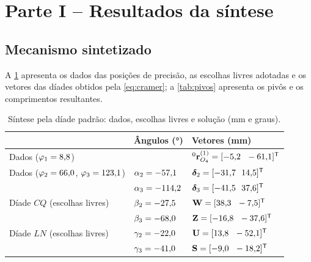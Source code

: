 \documentclass[12pt,a4paper,twoside]{article}
\newcommand{\rv}[2]{{}^{#1}\mathbf{r}_{#2}}          %
\numberwithin{equation}{section}
\begin{document}
\section{Parte I -- Resultados da síntese}\label{cap:resultados1}

\subsection{Mecanismo sintetizado}

A \cref{tab:diade} apresenta os dados das posições de precisão, as escolhas livres adotadas e
os vetores das díades obtidos pela \cref{eq:cramer}; a \cref{tab:pivos} apresenta os pivôs e
os comprimentos resultantes.

\begin{table}[htbp]
  \centering
  \caption{Síntese pela díade padrão: dados, escolhas livres e solução (mm e graus).}
  \label{tab:diade}
  \begin{tabular}{lll}
    \toprule
    & Ângulos (\si{\degree}) & Vetores (mm) \\
    \midrule
    Dados ($\varphi_1 = 8{,}8$) & & $\rv{0}{O_4}^{(1)} = [\dOx\ \ \dOy]^{\mathsf T}$ \\
    Dados ($\varphi_2 = 66{,}0$, $\varphi_3 = 123{,}1$) & $\alpha_2 = -57{,}1$ & $\boldsymbol\delta_2 = [\ddeltaAx\ \ \ddeltaAy]^{\mathsf T}$ \\
                                            & $\alpha_3 = -114{,}2$ & $\boldsymbol\delta_3 = [\ddeltaBx\ \ \ddeltaBy]^{\mathsf T}$ \\
    \midrule
    Díade $CQ$ (escolhas livres) & $\beta_2 = -27{,}5$ & $\mathbf W = [38{,}3\ \ -7{,}5]^{\mathsf T}$ \\
                                  & $\beta_3 = -68{,}0$ & $\mathbf Z = [-16{,}8\ \ -37{,}6]^{\mathsf T}$ \\
    \midrule
    Díade $LN$ (escolhas livres) & $\gamma_2 = -22{,}0$ & $\mathbf U = [13{,}8\ \ -52{,}1]^{\mathsf T}$ \\
                                  & $\gamma_3 = -41{,}0$ & $\mathbf S = [-9{,}0\ \ -18{,}2]^{\mathsf T}$ \\
    \bottomrule
  \end{tabular}
\end{table}
\end{document}

